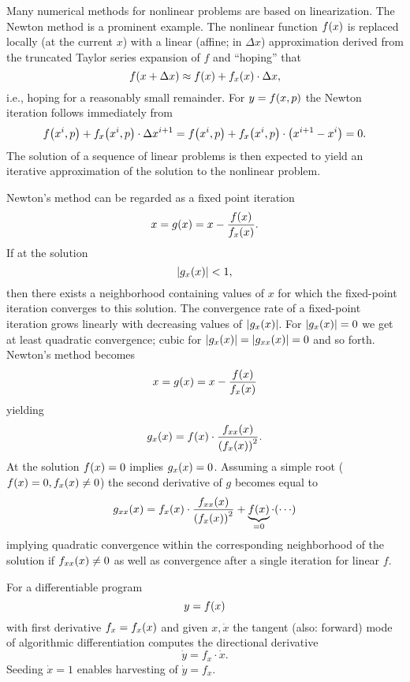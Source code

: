 \documentclass[english]{lecture}
\begin{document}
    Many numerical methods for nonlinear problems are based on linearization.
    The Newton method is a prominent example.
    The nonlinear function \(f\parentheses*{x}\) is replaced locally (at the current \(x\)) with a linear (affine; in \(\Delta x\)) approximation derived from the truncated Taylor series expansion of \(f\) and ``hoping'' that
    \[
        f\parentheses*{x + \Delta x} \approx f\parentheses*{x} + f_x\parentheses*{x} \cdot \Delta x,
    \]
    i.e., hoping for a reasonably small remainder.
    For \(y = f\parentheses*{x, p}\) the Newton iteration follows immediately from
    \[
        f\parentheses*{x^i, p} + f_x\parentheses*{x^i, p} \cdot \Delta x^{i + 1} = f\parentheses*{x^i, p} + f_x\parentheses*{x^i, p} \cdot \parentheses*{x^{i + 1} - x^i} = 0.
    \]
    The solution of a sequence of linear problems is then expected to yield an iterative approximation of the solution to the nonlinear problem.

    Newton's method can be regarded as a fixed point iteration
    \[
        x = g\parentheses*{x} = x - \frac{f\parentheses*{x}}{f_x\parentheses*{x}}.
    \]
    If at the solution
    \[
        \absolute*{g_x\parentheses*{x}} < 1,
    \]
    then there exists a neighborhood containing values of \(x\) for which the fixed-point iteration converges to this solution.
    The convergence rate of a fixed-point iteration grows linearly with decreasing values of \(\absolute*{g_x\parentheses*{x}}\).
    For \(\absolute*{g_x\parentheses*{x}} = 0\) we get at least quadratic convergence; cubic for \(\absolute*{g_x\parentheses*{x}} = \absolute*{g_{xx}\parentheses*{x}} = 0\) and so forth.
    Newton's method becomes
    \[
        x = g\parentheses*{x} = x - \frac{f\parentheses*{x}}{f_x\parentheses*{x}}
    \]
    yielding
    \[
        g_x\parentheses*{x} = f\parentheses*{x} \cdot \frac{f_{xx}\parentheses*{x}}{\parentheses*{f_x\parentheses*{x}}^2}.
    \]
    At the solution \(f\parentheses*{x} = 0\) implies \(g_x\parentheses*{x} = 0\).
    Assuming a simple root (\(f\parentheses*{x} = 0, f_x\parentheses*{x} \ne 0\)) the second derivative of \(g\) becomes equal to
    \[
        g_{xx}\parentheses*{x} = f_x\parentheses*{x} \cdot \frac{f_{xx}\parentheses*{x}}{\parentheses*{f_x\parentheses*{x}}^2} + \underbrace{f\parentheses*{x}}_{= 0} \cdot \parentheses*{\cdots}
    \]
    implying quadratic convergence within the corresponding neighborhood of the solution if \(f_{xx}\parentheses*{x} \ne 0\) as well as convergence after a single iteration for linear \(f\).

    For a differentiable program
    \[
        y = f\parentheses*{x}
    \]
    with first derivative \(f_x = f_x\parentheses*{x}\) and given \(x, \dot{x}\) the tangent (also: forward) mode of algorithmic differentiation computes the directional derivative
    \[
        \dot{y} = f_x \cdot \dot{x}.
    \]
    Seeding \(\dot{x} = 1\) enables harvesting of \(\dot{y} = f_x\).
\end{document}

